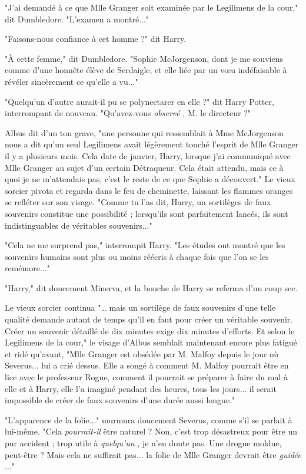 "J'ai demandé à ce que Mlle Granger soit examinée par le Legilimens de la cour," dit Dumbledore. "L'examen a montré..."

"Faisons-nous confiance à cet homme ?" dit Harry.

"À cette femme," dit Dumbledore. "Sophie McJorgenson, dont je me souviens comme d'une honnête élève de Serdaigle, et elle liée par un vœu indéfaisable à révéler sincèrement ce qu'elle a vu..."

"Quelqu'un d'autre aurait-il pu se polynectarer en elle ?" dit Harry Potter, interrompant de nouveau. "Qu'avez-vous \emph{observé} , M. le directeur ?"

Albus dit d'un ton grave, "une personne qui ressemblait à Mme McJorgenson nous a dit qu'un seul Legilimens avait légèrement touché l'esprit de Mlle Granger il y a plusieurs mois. Cela date de janvier, Harry, lorsque j'ai communiqué avec Mlle Granger au sujet d'un certain Détraqueur. Cela était attendu, mais ce à quoi je ne m'attendais pas, c'est le reste de ce que Sophie a découvert." Le vieux sorcier pivota et regarda dans le feu de cheminette, laissant les flammes oranges se refléter sur son visage. "Comme tu l'as dit, Harry, un sortilèges de faux souvenirs constitue une possibilité ; lorsqu'ils sont parfaitement lancés, ils sont indistinguables de véritables souvenirs..."

"Cela ne me surprend pas," interrompit Harry. "Les études ont montré que les souvenirs humains sont plus ou moins réécris à chaque fois que l'on se les remémore..."

"Harry," dit doucement Minerva, et la bouche de Harry se referma d'un coup sec.

Le vieux sorcier continua "… mais un sortilège de faux souvenirs d'une telle qualité demande autant de temps qu'il en faut pour créer un véritable souvenir. Créer un souvenir détaillé de dix minutes exige dix minutes d'efforts. Et selon le Legilimens de la cour," le visage d'Albus semblait maintenant encore plus fatigué et ridé qu'avant, "Mlle Granger est obsédée par M. Malfoy depuis le jour où Severus... lui a crié dessus. Elle a songé à comment M. Malfoy pourrait être en lice avec le professeur Rogue, comment il pourrait se préparer à faire du mal à elle et à Harry, elle l'a imaginé pendant des heures, tous les jours... il serait impossible de créer de faux souvenirs d'une durée aussi longue."

"L'apparence de la folie..." murmura doucement Severus, comme s'il se parlait à lui-même. "Cela \emph{pourrait-il}  être naturel ? Non, c'est trop désastreux pour être un pur accident ; trop utile à \emph{quelqu'un} , je n'en doute pas. Une drogue moldue, peut-être ? Mais cela ne suffirait pas... la folie de Mlle Granger devrait être \emph{guidée} ..."

